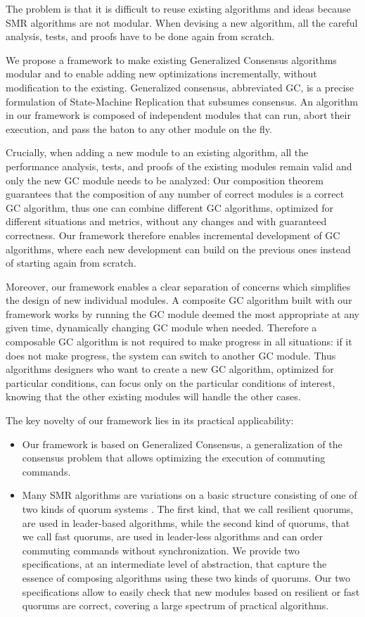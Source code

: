 The problem is that it is difficult to reuse existing algorithms and ideas because
SMR algorithms are not modular. When devising a new algorithm, all the careful
analysis, tests, and proofs have to be done again from scratch.

We propose a framework to make existing Generalized Consensus algorithms modular
and to enable adding new optimizations incrementally, without modification to
the existing. Generalized consensus, abbreviated GC, is a precise formulation of
State-Machine Replication that subsumes consensus. An algorithm in our framework
is composed of independent modules that can run, abort their execution, and pass
the baton to any other module on the fly.

Crucially, when adding a new module to an existing algorithm, all the
performance analysis, tests, and proofs of the existing modules remain valid and
only the new GC module needs to be analyzed: Our composition theorem guarantees
that the composition of any number of correct modules is a correct GC algorithm,
thus one can combine different GC algorithms, optimized for different situations
and metrics, without any changes and with guaranteed correctness. Our framework
therefore enables incremental development of GC algorithms, where each new
development can build on the previous ones instead of starting again from
scratch.

Moreover, our framework enables a clear separation of concerns which simplifies
the design of new individual modules. A composite GC algorithm built with our
framework works by running the GC module deemed the most appropriate at any
given time, dynamically changing GC module when needed. Therefore a composable
GC algorithm is not required to make progress in all situations: if it does
not make progress, the system can switch to another GC module. Thus algorithms
designers who want to create a new GC algorithm, optimized for particular
conditions, can focus only on the particular conditions of interest, knowing
that the other existing modules will handle the other cases.

The key novelty of our framework lies in its practical applicability:
\begin{itemize}
  \item Our framework is based on Generalized Consensus, a generalization of the consensus problem 
    that allows optimizing the execution of commuting commands.
  \item Many SMR algorithms are variations on a basic structure consisting of one of two kinds of 
    quorum systems \cite{GuerraouiVukolic10RefinedQuorumSystems}. 
    The first kind, that we call resilient quorums, are used in leader-based algorithms, while the second
    kind of quorums, that we call fast quorums, are used in leader-less algorithms and can order commuting commands without synchronization.
    We provide two specifications, at an intermediate level of abstraction, that capture the essence of composing algorithms using these two kinds of quorums.
    Our two specifications allow to easily check that new modules based on resilient or fast quorums are correct, covering a large spectrum of practical algorithms. 
\end{itemize}

